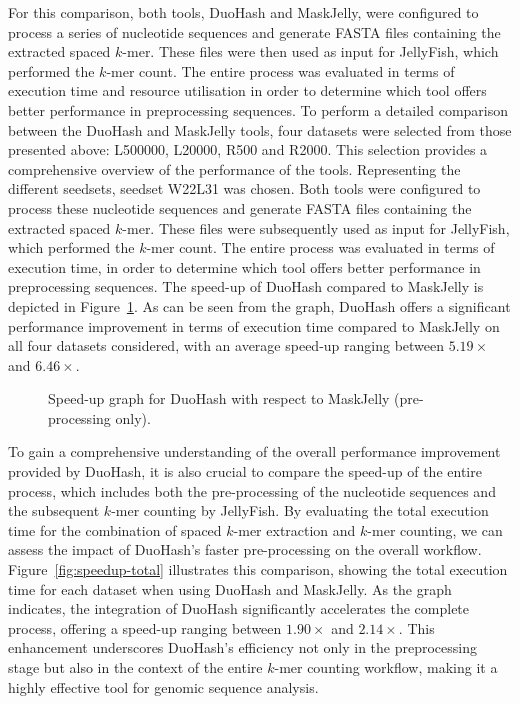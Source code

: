 For this comparison, both tools, DuoHash and MaskJelly, were configured to process a series of nucleotide sequences and generate FASTA files containing the extracted spaced $k$-mer. These files were then used as input for JellyFish, which performed the $k$-mer count. The entire process was evaluated in terms of execution time and resource utilisation in order to determine which tool offers better performance in preprocessing sequences. To perform a detailed comparison between the DuoHash and MaskJelly tools, four datasets were selected from those presented above: L500000, L20000, R500 and R2000. This selection provides a comprehensive overview of the performance of the tools. Representing the different seedsets, seedset W22L31 was chosen. Both tools were configured to process these nucleotide sequences and generate FASTA files containing the extracted spaced $k$-mer. These files were subsequently used as input for JellyFish, which performed the $k$-mer count. The entire process was evaluated in terms of execution time, in order to determine which tool offers better performance in preprocessing sequences. The speed-up of DuoHash compared to MaskJelly is depicted in Figure~\ref{fig:speedup-preprocessing}. As can be seen from the graph, DuoHash offers a significant performance improvement in terms of execution time compared to MaskJelly on all four datasets considered, with an average speed-up ranging between $5.19\times$ and $6.46\times$.

\begin{figure}[!ht]
	\centering
	\caption{Speed-up graph for DuoHash with respect to MaskJelly (pre-processing only).}
	\label{fig:speedup-preprocessing}
\end{figure}



To gain a comprehensive understanding of the overall performance improvement provided by DuoHash, it is also crucial to compare the speed-up of the entire process, which includes both the pre-processing of the nucleotide sequences and the subsequent $k$-mer counting by JellyFish. By evaluating the total execution time for the combination of spaced $k$-mer extraction and $k$-mer counting, we can assess the impact of DuoHash's faster pre-processing on the overall workflow. Figure~\ref{fig:speedup-total} illustrates this comparison, showing the total execution time for each dataset when using DuoHash and MaskJelly. As the graph indicates, the integration of DuoHash significantly accelerates the complete process, offering a speed-up ranging between $1.90\times$ and $2.14\times$. This enhancement underscores DuoHash's efficiency not only in the preprocessing stage but also in the context of the entire $k$-mer counting workflow, making it a highly effective tool for genomic sequence analysis.

